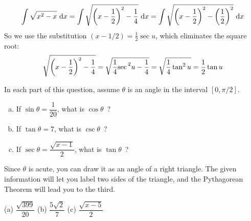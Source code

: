\begin{solution}
\begin{enumerate}[(a)]
\[\displaystyle\int \sqrt{x^2-x}~\mathrm{d}x=\displaystyle\int \sqrt{\left(x-\frac{1}{2}\right)^2 -\frac{1}{4}}~\mathrm{d}x=\displaystyle\int  \sqrt{\left(x-\frac{1}{2}\right)^2 -\left(\frac{1}{2}\right)^2}~\mathrm{d}x\]
So we use the substitution $(x-1/2) = \frac{1}{2}\sec u$, which eliminates the square root:
\[\sqrt{\left(x-\frac{1}{2}\right)^2-\frac{1}{4}}=\sqrt{\frac{1}{4}{\sec\vphantom{|}}^2 u - \frac{1}{4}} = \sqrt{\frac{1}{4}\tan^2 u} =\frac{1}{2}\tan u\]

\end{enumerate}

\end{solution}



\begin{question}\label{prob:s1.9_3}
In each part of this question, assume  $\theta$ is an angle in the interval $\left[ 0,\pi/2\right]$.
\begin{enumerate}[(a)]
\item If $\sin\theta=\dfrac{1}{20}$, what is $\cos\theta$~?
\item If $\tan\theta=7$, what is $\csc\theta$~?
\item If $\sec\theta=\dfrac{\sqrt{x-1}}{2}$, what is $\tan\theta$~?
\end{enumerate}
\end{question}
\begin{hint}
Since $\theta$ is acute, you can draw it as an angle of a right triangle. The given information will let you label two sides of the triangle, and the Pythagorean Theorem will lead you to the third.
\end{hint}
\begin{answer}
(a) $\dfrac{\sqrt{399}}{20}$\qquad
(b) $\dfrac{5\sqrt{2}}{7}$\qquad
(c) $\dfrac{\sqrt{x-5}}{2} $
\end{answer}
